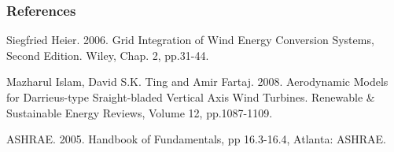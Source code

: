 \subsubsection{References}\label{references-3-002}

Siegfried Heier. 2006. Grid Integration of Wind Energy Conversion Systems, Second Edition. Wiley, Chap. 2, pp.31-44.

Mazharul Islam, David S.K. Ting and Amir Fartaj. 2008. Aerodynamic Models for Darrieus-type Sraight-bladed Vertical Axis Wind Turbines. Renewable \& Sustainable Energy Reviews, Volume 12, pp.1087-1109.

ASHRAE. 2005. Handbook of Fundamentals, pp 16.3-16.4, Atlanta: ASHRAE.
